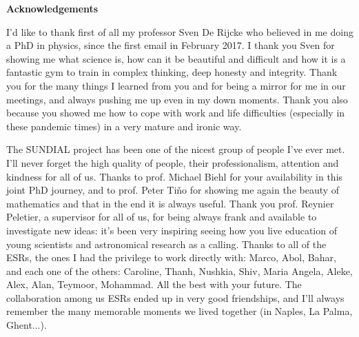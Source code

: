\clearpage
\thispagestyle{empty}
\null%
\label{thesis:acknowledgements}
\begin{center}
  {\Large \textbf{Acknowledgements}}\\
\end{center}
{\small{}
I'd like to thank first of all my professor Sven De Rijcke who believed in me doing a PhD in physics, since the first email in February 2017.
I thank you Sven for showing me what science is, how can it be beautiful and difficult and how it is a fantastic gym to train in complex thinking, deep honesty and integrity.
Thank you for the many things I learned from you and for being a mirror for me in our meetings, and always pushing me up even in my down moments.
Thank you also because you showed me how to cope with work and life difficulties (especially in these pandemic times) in a very mature and ironic way.

The SUNDIAL project has been one of the nicest group of people I've ever met.
I'll never forget the high quality of people, their professionalism, attention and kindness for all of us.
Thanks to prof. Michael Biehl for your availability in this joint PhD journey, and to prof. Peter Ti\v{n}o for showing me again the beauty of mathematics and that in the end it is always useful.
Thank you prof. Reynier Peletier, a supervisor for all of us, for being always frank and available to investigate new ideas: %
it's been very inspiring seeing how you live education of young scientists and astronomical research as a calling.
Thanks to all of the ESRs, the ones I had the privilege to work directly with: Marco, Abol, Bahar, and each one of the others: Caroline, Thanh, Nushkia, Shiv, Maria Angela, Aleke, Alex, Alan, Teymoor, Mohammad. All the best with your future.
The collaboration among us ESRs ended up in very good friendships, and I'll always remember the many memorable moments we lived together (in Naples, La Palma, Ghent...).

}
